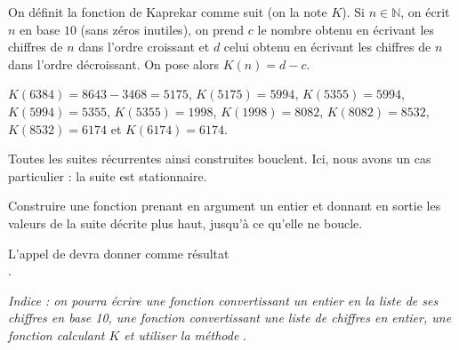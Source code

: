 On définit la fonction de Kaprekar comme suit (on la note $K$). 
Si $n\in\mathbb{N}$, on écrit $n$ en base $10$ (sans zéros inutiles), on prend $c$ le nombre obtenu en écrivant les chiffres de $n$ dans l'ordre croissant et $d$ celui obtenu en écrivant les chiffres de $n$ dans l'ordre décroissant. 
On pose alors $K(n) = d-c$.
\begin{ex}
  $K(6384) = 8643 - 3468 = 5175$, $K(5175) = 5994$, $K(5355) = 5994$, $K(5994) = 5355$, $K(5355) = 1998$, $K(1998)=8082$, $K(8082) = 8532$, $K(8532) = 6174$ et $K(6174) = 6174$.
\end{ex}
Toutes les suites récurrentes ainsi construites bouclent. Ici, nous avons un cas particulier : la suite est stationnaire.

\question Construire une fonction  prenant en argument un entier  et donnant en sortie les valeurs de la suite décrite plus haut, jusqu'à ce qu'elle ne boucle. 

\begin{ex}
  L'appel de  devra donner comme résultat\\ \pyv{[6384, 5175, 5994, 5355, 1998, 8082, 8532, 6174]}.
\end{ex}

\emph{Indice : on pourra écrire une fonction convertissant un entier en la liste de ses chiffres en base 10, une fonction convertissant une liste de chiffres en entier, une fonction calculant $K$ et utiliser la méthode }.
